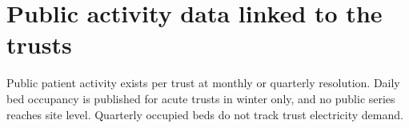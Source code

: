 \documentclass[10pt,a4paper]{article}
\newcommand{\tablefont}{\small\renewcommand{\arraystretch}{1.08}}
\newenvironment{figblock}{\par\medskip\noindent\begin{minipage}{\textwidth}}{\end{minipage}\par\medskip}
\begin{document}
\section{Public activity data linked to the trusts}
\begin{figblock}\centering\tablefont

\end{figblock}

Public patient activity exists per trust at monthly or quarterly resolution. Daily bed occupancy is published for acute trusts in winter only, and no public series reaches site level. Quarterly occupied beds do not track trust electricity demand.
\end{document}
